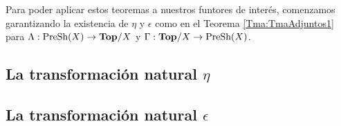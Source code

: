 Para poder aplicar estos teoremas a nuestros funtores de interés, comenzamos garantizando la existencia de $\eta$ y $\epsilon$ como en el Teorema \ref{Tma:TmaAdjuntos1} para $\Lambda:\normalfont{\text{PreSh}}(X)\to\normalfont{\textbf{Top}}/X$ y $\Gamma:\normalfont{\textbf{Top}}/X\to\normalfont{\text{PreSh}}(X)$.

\subsection{La transformación natural $\eta$}
   
\subsection{La transformación natural $\epsilon$}
   
